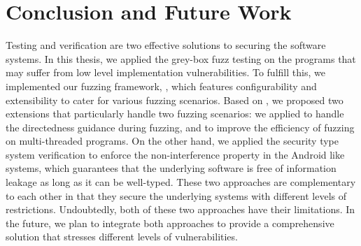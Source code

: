 
\chapter{Conclusion and Future Work} \label{ch:conclusion}


Testing and verification are two effective solutions to securing the software systems. In this thesis, we applied the grey-box fuzz testing on the programs that may suffer from low level implementation vulnerabilities. To fulfill this, we implemented our fuzzing framework, \FOT, which features configurability and extensibility to cater for various fuzzing scenarios. Based on \FOT, we proposed two extensions that particularly handle two fuzzing scenarios: we applied \dFOT to handle the directedness guidance during fuzzing, and \mtfuzz to improve the efficiency of fuzzing on multi-threaded programs. On the other hand, we applied the security type system verification to enforce the non-interference property in the Android like systems, which guarantees that the underlying software is free of information leakage as long as it can be well-typed. These two approaches are complementary to each other in that they secure the underlying systems with different levels of restrictions. Undoubtedly, both of these two approaches have their limitations. In the future, we plan to integrate both approaches to provide a comprehensive solution that stresses different levels of vulnerabilities.
